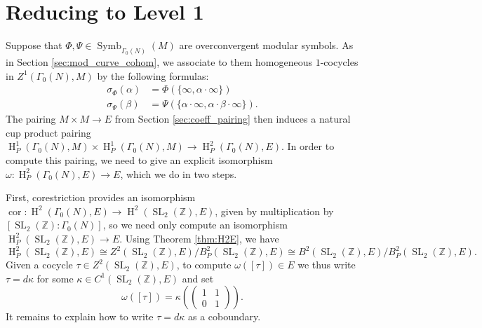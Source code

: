 \documentclass[10pt]{amsart}
\theoremstyle{plain}
\theoremstyle{definition}
\newcommand{\ZZ}{{\mathbb{Z}}}
\DeclareMathOperator{\SL}{SL}
\DeclareMathOperator{\Symb}{Symb}
\DeclareMathOperator{\Hh}{H}
\DeclareMathOperator{\cor}{cor}
\begin{document}
\section{Reducing to Level 1} \label{sec:level_one}

Suppose that $\Phi, \Psi \in \Symb_{\Gamma_0(N)}(M)$ are overconvergent modular symbols.  As in Section \ref{sec:mod_curve_cohom}, we associate to them homogeneous $1$-cocycles in $Z^1(\Gamma_0(N), M)$ by the following formulas:
\begin{align*}
\sigma_{\Phi}(\alpha) &= \Phi(\{\infty, \alpha \cdot \infty\}) \\
\sigma_{\Psi}(\beta) &= \Psi(\{\alpha \cdot \infty, \alpha \cdot \beta \cdot \infty\}).
\end{align*}
The pairing $M \times M \to E$ from Section \ref{sec:coeff_pairing} then induces a natural cup product pairing $\Hh^1_P(\Gamma_0(N), M) \times \Hh^1_P(\Gamma_0(N), M) \to \Hh^2_P(\Gamma_0(N), E)$.  In order to compute this pairing, we need to give an explicit isomorphism $\omega : \Hh^2_P(\Gamma_0(N), E) \to E$, which we do in two steps.

First, corestriction provides an isomorphism $\cor : \Hh^2(\Gamma_0(N), E) \to \Hh^2(\SL_2(\ZZ), E)$, given by multiplication by $[\SL_2(\ZZ) : \Gamma_0(N)]$,  so we need only compute an isomorphism $\Hh^2_P(\SL_2(\ZZ), E) \to E$.  Using Theorem \ref{thm:H2E}, we have
\[
\Hh^2_P(\SL_2(\ZZ), E) \cong Z^2(\SL_2(\ZZ), E) / B^2_P(\SL_2(\ZZ), E) \cong B^2(\SL_2(\ZZ), E) / B^2_P(\SL_2(\ZZ), E).
\]
Given a cocycle $\tau \in Z^2(\SL_2(\ZZ), E)$, to compute $\omega([\tau]) \in E$ we thus write $\tau = d\kappa$ for some $\kappa \in C^1(\SL_2(\ZZ), E)$ and set
\[
\omega([\tau]) = \kappa\left( \begin{pmatrix} 1 & 1 \\ 0 & 1 \end{pmatrix}\right).
\]
It remains to explain how to write $\tau = d\kappa$ as a coboundary.
\end{document}
